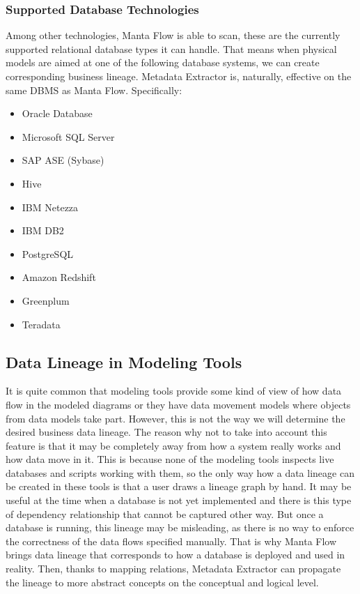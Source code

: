 \subsubsection{Supported Database Technologies}
Among other technologies, Manta Flow is able to scan, these are the currently supported relational database types it can handle. 
That means when physical models are aimed at one of the following database systems, we can create corresponding business lineage. Metadata Extractor is, naturally, effective on the same DBMS as Manta Flow. Specifically:
\begin{itemize}
	\item Oracle Database
	\item Microsoft SQL Server
	\item SAP ASE (Sybase)
	\item Hive
	\item IBM Netezza
	\item IBM DB2
	\item PostgreSQL
	\item Amazon Redshift
	\item Greenplum
	\item Teradata
\end{itemize}

\subsection{Data Lineage in Modeling Tools}

It is quite common that modeling tools provide some kind of view of how data flow in the modeled diagrams or they have data movement models where objects from data models take part. 
However, this is not the way we will determine the desired business data lineage.
The reason why not to take into account this feature is that it may be completely away from how a system really works and how data move in it. 
This is because none of the modeling tools inspects live databases and scripts working with them, so the only way how a data lineage can be created in these tools is that a user draws a lineage graph by hand.
It may be useful at the time when a database is not yet implemented and there is this type of dependency relationship that cannot be captured other way. But once a database is running, this lineage may be misleading, as there is no way to enforce the correctness of the data flows specified manually.
That is why Manta Flow brings data lineage that corresponds to how a database is deployed and used in reality. Then, thanks to mapping relations, Metadata Extractor can propagate the lineage to more abstract concepts on the conceptual and logical level.
